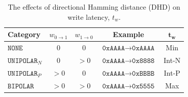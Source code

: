 \begin{table}[t!]
\centering
\caption{The effects of directional Hamming distance (DHD) on write latency, $t_{w}$.}
\label{tab:polarity-mix}
\vspace{-0.55em}
\begin{tabular*}{\linewidth}{@{\extracolsep{\fill}}lcccc@{}}
\toprule

\textbf{Category} &
\textbf{$w_{0\to1}$} & 
\textbf{$w_{1\to0}$} &
\textbf{Example} &
$\mathbf{t_{w}}$ \\
\midrule
$\texttt{NONE}$         & $0$ & $0$ & $\texttt{0xAAAA} \to \texttt{0xAAAA}$ & Min \\
$\texttt{UNIPOLAR}_{N}$ & $0$ & $>0$ & $\texttt{0xAAAA} \to \texttt{0x8888}$ & Int-N \\
$\texttt{UNIPOLAR}_{P}$ & $>0$ & $0$ & $\texttt{0xAAAA} \to \texttt{0xBBBB}$ & Int-P \\
$\texttt{BIPOLAR}$      & $>0$ & $>0$ & $\texttt{0xAAAA} \to \texttt{0x5555}$ & Max \\

\bottomrule
\end{tabular*}
\end{table}